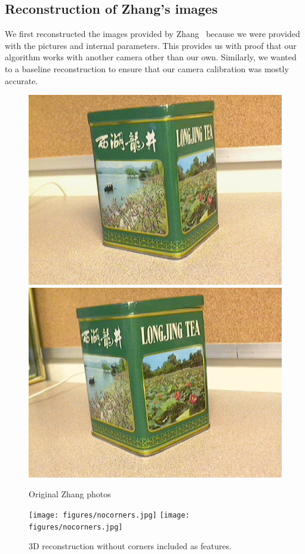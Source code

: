 \subsection{Reconstruction of Zhang's images}
We first reconstructed the images provided by Zhang~\cite{Calibration} because we were provided with the pictures and internal parameters. This provides us with proof that our algorithm works with another camera other than our own. Similarly, we wanted to a baseline reconstruction to ensure that our camera calibration was mostly accurate. 

\begin{figure}[H]
\begin{center}
\includegraphics[width=0.45\linewidth]{figures/TeaBox1.jpg}
\includegraphics[width=0.45\linewidth]{figures/TeaBox2.jpg}
\end{center}
\caption{Original Zhang photos}
\label{zhang_original}
\end{figure}

\begin{figure}[H]
\begin{center}
\texttt{[image: figures/nocorners.jpg]}
\texttt{[image: figures/nocorners.jpg]}
\end{center}
\caption{3D reconstruction without corners included as features.}
\label{zhang_nocorners}
\end{figure}

